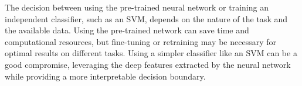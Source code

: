 The decision between using the pre-trained neural network or training an independent classifier, such as an SVM, depends on the nature of the task and the available data. Using the pre-trained network can save time and computational resources, but fine-tuning or retraining may be necessary for optimal results on different tasks. Using a simpler classifier like an SVM can be a good compromise, leveraging the deep features extracted by the neural network while providing a more interpretable decision boundary.